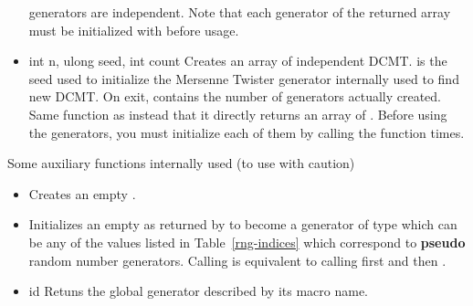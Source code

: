 \begin{itemize}
  generators are independent. Note that each generator of the returned array
  must be initialized with  before usage.
\item {}
  {int n, ulong seed, int \ptr count}
  \sshortdescribe Creates an array of  independent DCMT.  is
  the seed used to initialize the Mersenne Twister generator internally used to
  find new DCMT. On exit,  contains the number of generators actually
  created. Same function as  instead that it
  directly returns an array of . Before using the generators, you
  must initialize each of them by calling the function 
   times.
\end{itemize}

Some auxiliary functions internally used (to use with caution)
\begin{itemize}
\item {}
  \sshortdescribe Creates an empty .
\item {}
  \sshortdescribe Initializes an empty  as returned by
   to become a generator of type  which can be
  any of the values  listed in Table~\ref{rng-indices} which
  correspond to {\bf pseudo} random number generators.
  Calling  is equivalent to calling first
   and then . 
\item {}
  { id}
  \sshortdescribe Retuns the global generator described by its macro name.
\end{itemize}


